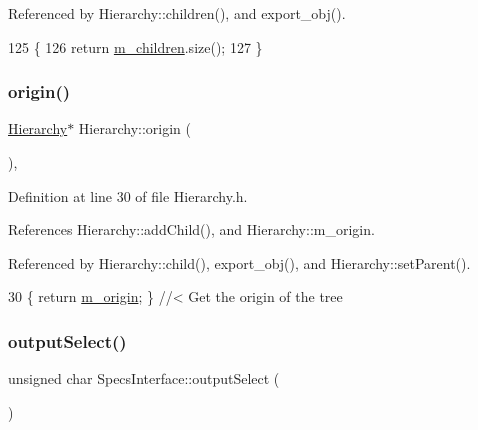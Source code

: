 Referenced by Hierarchy\+::children(), and export\+\_\+obj().


\begin{DoxyCode}
125                                            \{
126   \textcolor{keywordflow}{return} \hyperlink{classHierarchy_a038816763941fd4a930504917f60483b}{m\_children}.size();
127 \}
\end{DoxyCode}
\mbox{\label{classHierarchy_aee461dc930ce3871636ff87f075b1b83}} 
\subsubsection{\texorpdfstring{origin()}{origin()}}
{\footnotesize\ttfamily \hyperlink{classHierarchy}{Hierarchy}$\ast$ Hierarchy\+::origin (\begin{DoxyParamCaption}{ }\end{DoxyParamCaption})\hspace{0.3cm}{\ttfamily [inline]}, {\ttfamily [inherited]}}



Definition at line 30 of file Hierarchy.\+h.



References Hierarchy\+::add\+Child(), and Hierarchy\+::m\+\_\+origin.



Referenced by Hierarchy\+::child(), export\+\_\+obj(), and Hierarchy\+::set\+Parent().


\begin{DoxyCode}
30 \{ \textcolor{keywordflow}{return} \hyperlink{classHierarchy_a16c73e557d3a7c156ffb5dc4102d148e}{m\_origin}; \}  \textcolor{comment}{//< Get the origin of the tree}
\end{DoxyCode}
\mbox{\label{classSpecsInterface_ab291ed03f4c2f0143e14c26ad5f648dd}} 
\subsubsection{\texorpdfstring{output\+Select()}{outputSelect()}}
{\footnotesize\ttfamily unsigned char Specs\+Interface\+::output\+Select (\begin{DoxyParamCaption}{ }\end{DoxyParamCaption})}




